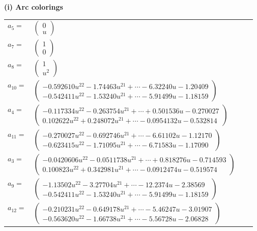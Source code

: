 \documentclass[1p]{elsarticle_modified}
\theoremstyle{definition}
\begin{document}
\flushleft \textbf{(i) Arc colorings}\\
\begin{tabular}{m{7pt} m{180pt} m{7pt} m{180pt} }
\flushright $a_{5}=$&$\begin{pmatrix}0\\u\end{pmatrix}$ \\
\flushright $a_{7}=$&$\begin{pmatrix}1\\0\end{pmatrix}$ \\
\flushright $a_{8}=$&$\begin{pmatrix}1\\u^2\end{pmatrix}$ \\
\flushright $a_{10}=$&$\begin{pmatrix}-0.592610 u^{22}-1.74463 u^{21}+\cdots-6.32240 u-1.20409\\-0.542411 u^{22}-1.53240 u^{21}+\cdots-5.91499 u-1.18159\end{pmatrix}$ \\
\flushright $a_{4}=$&$\begin{pmatrix}-0.117334 u^{22}-0.263754 u^{21}+\cdots+0.501536 u-0.270027\\0.102622 u^{22}+0.248072 u^{21}+\cdots-0.0954132 u-0.532814\end{pmatrix}$ \\
\flushright $a_{11}=$&$\begin{pmatrix}-0.270027 u^{22}-0.692746 u^{21}+\cdots-6.61102 u-1.12170\\-0.623415 u^{22}-1.71095 u^{21}+\cdots-6.71583 u-1.17090\end{pmatrix}$ \\
\flushright $a_{3}=$&$\begin{pmatrix}-0.0420606 u^{22}-0.0511738 u^{21}+\cdots+0.818276 u-0.714593\\0.100823 u^{22}+0.342981 u^{21}+\cdots-0.0912474 u-0.519574\end{pmatrix}$ \\
\flushright $a_{9}=$&$\begin{pmatrix}-1.13502 u^{22}-3.27704 u^{21}+\cdots-12.2374 u-2.38569\\-0.542411 u^{22}-1.53240 u^{21}+\cdots-5.91499 u-1.18159\end{pmatrix}$ \\
\flushright $a_{12}=$&$\begin{pmatrix}-0.210231 u^{22}-0.649178 u^{21}+\cdots-5.46247 u-3.01907\\-0.563620 u^{22}-1.66738 u^{21}+\cdots-5.56728 u-2.06828\end{pmatrix}$ \\

\end{tabular}
\end{document}
